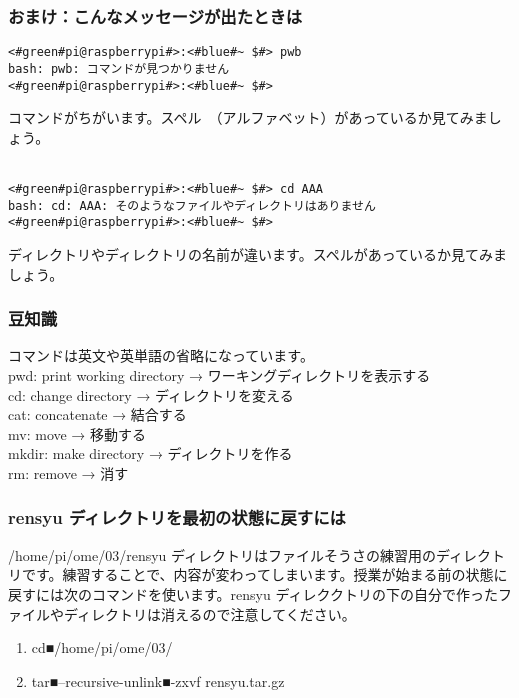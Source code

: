 \subsubsection{おまけ：こんなメッセージが出たときは}
\begin{lstlisting}[caption=コマンドがちがうときの例, label=cmdMiss]
<#green#pi@raspberrypi#>:<#blue#~ $#> pwb
bash: pwb: コマンドが見つかりません
<#green#pi@raspberrypi#>:<#blue#~ $#> 
\end{lstlisting}
コマンドがちがいます。スペル　（アルファベット）があっているか見てみましょう。\\\\

\begin{lstlisting}[caption=ディレクトリやファイルの名前がちがうときの例, label=nameMiss]
<#green#pi@raspberrypi#>:<#blue#~ $#> cd AAA
bash: cd: AAA: そのようなファイルやディレクトリはありません
<#green#pi@raspberrypi#>:<#blue#~ $#> 
\end{lstlisting}
ディレクトリやディレクトリの名前が違います。スペルがあっているか見てみましょう。\\

\subsubsection{豆知識}
コマンドは英文や英単語の省略になっています。\\
pwd: print working directory → ワーキングディレクトリを表示する\\
cd: change directory → ディレクトリを変える\\
cat: concatenate → 結合する\\
mv: move → 移動する\\
mkdir: make directory → ディレクトリを作る\\
rm: remove → 消す\\

\subsubsection{rensyu ディレクトリを最初の状態に戻すには}
/home/pi/ome/03/rensyu ディレクトリはファイルそうさの練習用のディレクトリです。練習することで、内容が変わってしまいます。授業が始まる前の状態に戻すには次のコマンドを使います。rensyu ディレククトリの下の自分で作ったファイルやディレクトリは消えるので注意してください。\\
\begin{enumerate}
\item  cd■/home/pi/ome/03/
\item  tar■--recursive-unlink■-zxvf rensyu.tar.gz
\end{enumerate}
